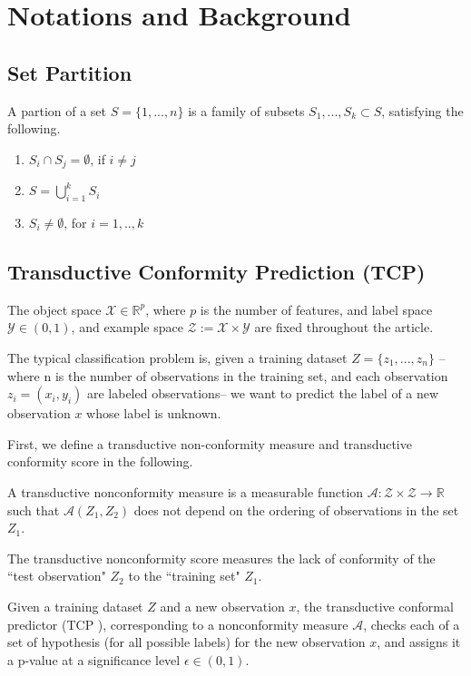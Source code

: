 \documentclass[main]{subfiles}
\begin{document}
\section{Notations and Background}
\subsection{Set Partition}
A partion of a set $S = \{ 1,...,n\}$ is a family of subsets $S_1, ..., S_k \subset S$, satisfying the following.
\begin{enumerate}
\item $S_i \cap S_j = \emptyset$, if $i \neq j$
\item $S = \bigcup_{i=1}^k S_i$
\item $ S_i \neq \emptyset$, for $i={1,..,k}$
\end{enumerate}
\subsection{Transductive Conformity Prediction (TCP)}
The object space $\mathcal{X} \in \mathbb{R}^p$, where $p$ is the number of features, and  label space $\mathcal{Y} \in (0,1)$, and example space $\mathcal{Z} := \mathcal{X} \times \mathcal{Y}$ are fixed throughout the article.

The typical classification problem is, given a training dataset $Z = \{ z_1 , ..., z_n \} $ -- where n is the number of observations in the training set, and each observation $z_i = (x_i, y_i)$ are labeled observations-- we want to predict the label of a new observation $x$ whose label is unknown. 

First, we define a transductive non-conformity measure and transductive conformity score in the following.

\begin{definition} 
A transductive nonconformity measure is a measurable function $\mathcal{A} : \mathcal{Z} \times \mathcal{Z}  \rightarrow \mathbb{R}$ such that $\mathcal{A}(Z_1 , Z_2 )$ does not depend on the ordering of observations in the set $Z_1$.
\end{definition}

\begin{definition}
The transductive nonconformity score measures the lack of conformity of the ``test observation" $Z_2$ to the ``training set" $Z_1$.
\end{definition}

\begin{definition}
Given a training dataset $Z$ and a new observation $x$, the transductive conformal predictor (TCP ), corresponding to a nonconformity measure $\mathcal{A}$, checks each of a set of hypothesis (for all possible labels) for the new observation $x$, and assigns it a p-value at a significance level $\epsilon \in (0, 1)$.  %
\end{definition}
\end{document}
